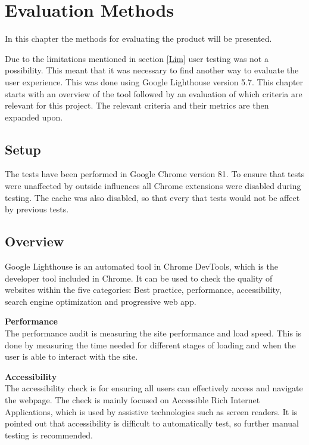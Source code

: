 \chapter{Evaluation Methods}\label{EvalMethods}

In this chapter the methods for evaluating the product will be presented.


Due to the limitations mentioned in section \ref{Lim} user testing was not a possibility. This meant that it was necessary to find another way to evaluate the user experience. This was done using Google Lighthouse version 5.7. 
This chapter starts with an overview of the tool followed by an evaluation of which criteria are relevant for this project. The relevant criteria and their metrics are then expanded upon.

\section{Setup}


The tests have been performed in Google Chrome version 81. To ensure that tests were unaffected by outside influences all Chrome extensions were disabled during testing. The cache was also disabled, so that every that tests would not be affect by previous tests.


\section{Overview}
Google Lighthouse is an automated tool in Chrome DevTools, which is the developer tool included in Chrome. It can be used to check the quality of websites within the five categories: Best practice, performance, accessibility, search engine optimization and progressive web app. \citep{Lighthouse}

\textbf{Performance}\\
The performance audit is measuring the site performance and load speed. This is done by measuring the time needed for different stages of loading and when the user is able to interact with the site. \citep{LhPerformance}


\textbf{Accessibility}\\
The accessibility check is for ensuring all users can effectively access and navigate the webpage. 
The check is mainly focused on Accessible Rich Internet Applications, which is used by assistive technologies such as screen readers.\citep{ARIA} It is pointed out that accessibility is difficult to automatically test, so further manual testing is recommended. 

